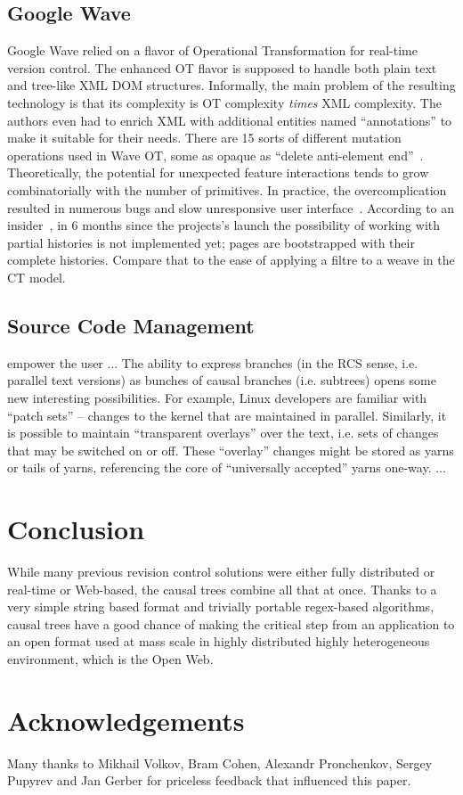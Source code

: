 \documentclass{acm_proc_article-sp}
\begin{document}
\subsection{Google Wave}  \label{sec:waveot}

Google Wave relied on a flavor of Operational Transformation for
real-time version control. The enhanced OT flavor is supposed to
handle both plain text and tree-like XML DOM structures.
Informally, the main problem of the resulting technology is that
its complexity is OT complexity \emph{times} XML complexity. 
The authors even had to enrich XML with additional entities 
named ``annotations'' to make it suitable for their needs.
There are 15 sorts of different mutation operations used in Wave
OT, some as opaque as ``delete anti-element end''~\cite{waveot}.
Theoretically, the potential for unexpected feature interactions
tends to grow combinatorially with the number of primitives.
In practice, the overcomplication resulted in numerous bugs and
slow unresponsive user interface~\cite{own-experience}.
According to an insider~\cite{gerasimov}, in 6 months since the
projects's launch the possibility of working with partial
histories is not  implemented yet; pages are bootstrapped with
their complete histories. Compare that to the ease of applying
a filtre to a weave in the CT model.

\subsection{Source Code Management}

empower the user ...
The ability to express branches (in the RCS sense, i.e. parallel text versions) as bunches of causal branches (i.e. subtrees) opens some new interesting possibilities.
For example, Linux developers are familiar with ``patch sets'' -- changes to the kernel that are maintained in parallel. Similarly, it is possible to maintain ``transparent overlays'' over the text, i.e. sets of changes that may be switched on or off. These ``overlay'' changes might be stored as yarns or tails of yarns, referencing the core of ``universally accepted'' yarns one-way.
...

\section {Conclusion} \label{sec:conclusion}

While many previous revision control solutions were either
fully distributed or real-time or Web-based, the causal trees
combine all that at once. Thanks to a very simple string based
format and trivially portable regex-based algorithms, causal trees
have a good chance of making the critical step from an
application to an open format used at mass scale in highly
distributed highly heterogeneous environment, which is the Open Web.


\section{Acknowledgements}

Many thanks to Mikhail Volkov, Bram Cohen,
Alexandr Pronchenkov, Sergey Pupyrev and Jan Gerber for priceless
feedback that influenced this paper.




\end{document}
